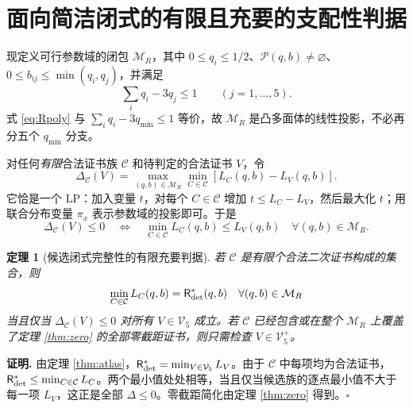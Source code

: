 \documentclass[11pt,a4paper]{ctexart}
\newtheorem{theorem}{定理}[section]
\theoremstyle{definition}
\newenvironment{proofcn}{\par\noindent\textbf{证明.} }{\hfill$\square$\par}
\newcommand{\calV}{\mathcal V}
\newcommand{\calM}{\mathcal M}
\newcommand{\Risk}{\mathsf R}
\begin{document}
\section{面向简洁闭式的有限且充要的支配性判据}
现定义可行参数域的闭包 $\calM_R$，其中 $0\le q_i\le1/2$、$\mathcal P(q,b)\ne\varnothing$、$0\le b_{ij}\le\min(q_i,q_j)$，并满足
\begin{equation}\label{eq:Rpoly}
\sum_iq_i-3q_j\le1\qquad(j=1,\ldots,5).
\end{equation}
式 \eqref{eq:Rpoly} 与 $\sum_iq_i-3q_{\min}\le1$ 等价，故 $\calM_R$ 是凸多面体的线性投影，不必再分五个 $q_{\min}$ 分支。

对任何\emph{有限}合法证书族 $\mathcal C$ 和待判定的合法证书 $V$，令
\begin{equation}\label{eq:dominance}
\Delta_{\mathcal C}(V)=\max_{(q,b)\in\calM_R}\min_{C\in\mathcal C}
\left[L_C(q,b)-L_V(q,b)\right].
\end{equation}
它恰是一个 LP：加入变量 $t$，对每个 $C\in\mathcal C$ 增加 $t\le L_C-L_V$，然后最大化 $t$；用联合分布变量 $\pi_x$ 表示参数域的投影即可。于是
\[
\Delta_{\mathcal C}(V)\le0
\quad\Longleftrightarrow\quad
\min_{C\in\mathcal C}L_C(q,b)\le L_V(q,b)\quad\forall(q,b)\in\calM_R.
\]

\begin{theorem}[候选闭式完整性的有限充要判据]
若 $\mathcal C$ 是有限个合法二次证书构成的集合，则
\[
\min_{C\in\mathcal C}L_C(q,b)=\Risk^*_{\rm det}(q,b)
\quad\forall(q,b)\in\calM_R
\]
当且仅当 $\Delta_{\mathcal C}(V)\le0$ 对\emph{所有} $V\in\calV_5$ 成立。若 $\mathcal C$ 已经包含或在整个 $\calM_R$ 上覆盖了定理 \ref{thm:zero} 的全部零截距证书，则只需检查 $V\in\calV_5^+$。
\end{theorem}
\begin{proofcn}
由定理 \ref{thm:atlas}，$\Risk^*_{\rm det}=\min_{V\in\calV_5}L_V$。由于 $\mathcal C$ 中每项均为合法证书，$\Risk^*_{\rm det}\le\min_{C\in\mathcal C}L_C$。两个最小值处处相等，当且仅当候选族的逐点最小值不大于每一项 $L_V$，这正是全部 $\Delta\le0$。零截距简化由定理 \ref{thm:zero} 得到。\end{proofcn}
\end{document}
